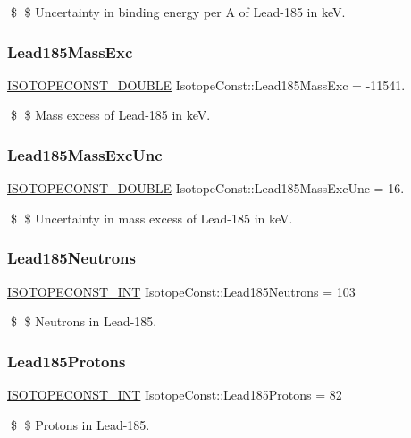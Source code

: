 \$ \$ Uncertainty in binding energy per A of Lead-\/185 in keV. \mbox{\label{group___isotope_const-_lead-_pb185_ga7bf53997df411c69ad4bd5a0ff3aed15}} 
\subsubsection{\texorpdfstring{Lead185\+Mass\+Exc}{Lead185MassExc}}
{\footnotesize\ttfamily \mbox{\hyperlink{group___isotope_const-_macros_ga8f45a7272ce02c0b4c65c44636ed719a}{I\+S\+O\+T\+O\+P\+E\+C\+O\+N\+S\+T\+\_\+\+D\+O\+U\+B\+LE}} Isotope\+Const\+::\+Lead185\+Mass\+Exc = -\/11541.}

\$ \$ Mass excess of Lead-\/185 in keV. \mbox{\label{group___isotope_const-_lead-_pb185_ga8054bf57035e41acd6852fa91427f503}} 
\subsubsection{\texorpdfstring{Lead185\+Mass\+Exc\+Unc}{Lead185MassExcUnc}}
{\footnotesize\ttfamily \mbox{\hyperlink{group___isotope_const-_macros_ga8f45a7272ce02c0b4c65c44636ed719a}{I\+S\+O\+T\+O\+P\+E\+C\+O\+N\+S\+T\+\_\+\+D\+O\+U\+B\+LE}} Isotope\+Const\+::\+Lead185\+Mass\+Exc\+Unc = 16.}

\$ \$ Uncertainty in mass excess of Lead-\/185 in keV. \mbox{\label{group___isotope_const-_lead-_pb185_gaa65a87b174a94eaf50a1920c38d7aa32}} 
\subsubsection{\texorpdfstring{Lead185\+Neutrons}{Lead185Neutrons}}
{\footnotesize\ttfamily \mbox{\hyperlink{group___isotope_const-_macros_ga5f18360b3e99483a35c32d789e62621c}{I\+S\+O\+T\+O\+P\+E\+C\+O\+N\+S\+T\+\_\+\+I\+NT}} Isotope\+Const\+::\+Lead185\+Neutrons = 103}

\$ \$ Neutrons in Lead-\/185. \mbox{\label{group___isotope_const-_lead-_pb185_gaa50a2fb0898eb1eb4fbb9c50d2f17db8}} 
\subsubsection{\texorpdfstring{Lead185\+Protons}{Lead185Protons}}
{\footnotesize\ttfamily \mbox{\hyperlink{group___isotope_const-_macros_ga5f18360b3e99483a35c32d789e62621c}{I\+S\+O\+T\+O\+P\+E\+C\+O\+N\+S\+T\+\_\+\+I\+NT}} Isotope\+Const\+::\+Lead185\+Protons = 82}

\$ \$ Protons in Lead-\/185. 